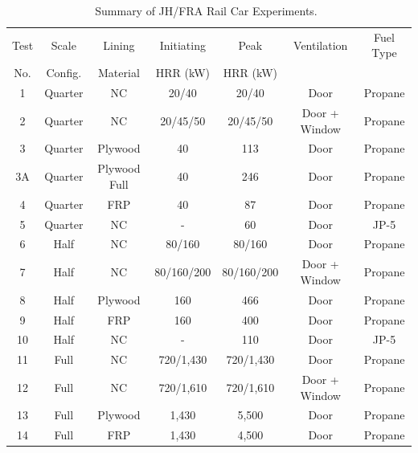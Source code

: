 \begin{table}[!htb]
\centering
\caption[Summary of JH/FRA Rail Car Experiments]{Summary of JH/FRA Rail Car Experiments.~\cite{Hodges:FRA22}}
\begin{tabular}{|c|c|c|c|c|c|c|}
\hline
Test & Scale   & Lining   &  Initiating & Peak       & Ventilation   & Fuel Type \\
No.  & Config. & Material &  HRR (kW)   & HRR (kW)   &               &           \\ \hline \hline
1    & Quarter & NC       & 20/40       & 20/40      & Door          & Propane   \\ \hline
2    & Quarter & NC       & 20/45/50    & 20/45/50   & Door + Window & Propane   \\ \hline
3    & Quarter & Plywood  & 40          & 113        & Door          & Propane   \\ \hline
3A    & Quarter & Plywood Full  & 40          & 246        & Door          & Propane   \\ \hline
4    & Quarter & FRP      & 40          & 87         & Door          & Propane   \\ \hline
5    & Quarter & NC       & -           & 60         & Door          & JP-5      \\ \hline
6    & Half    & NC       & 80/160      & 80/160     & Door          & Propane   \\ \hline
7    & Half    & NC       & 80/160/200  & 80/160/200 & Door + Window & Propane   \\ \hline
8    & Half    & Plywood  & 160         & 466        & Door          & Propane   \\ \hline
9    & Half    & FRP      & 160         & 400        & Door          & Propane   \\ \hline
10   & Half    & NC       & -           & 110        & Door          & JP-5      \\ \hline
11   & Full    & NC       & 720/1,430   & 720/1,430  & Door          & Propane   \\ \hline
12   & Full    & NC       & 720/1,610   & 720/1,610  & Door + Window & Propane   \\ \hline
13   & Full    & Plywood  & 1,430       & 5,500      & Door          & Propane   \\ \hline
14   & Full    & FRP      & 1,430       & 4,500      & Door          & Propane   \\ \hline

\end{tabular}
\label{JH_FRA_Matrix}
\end{table}

